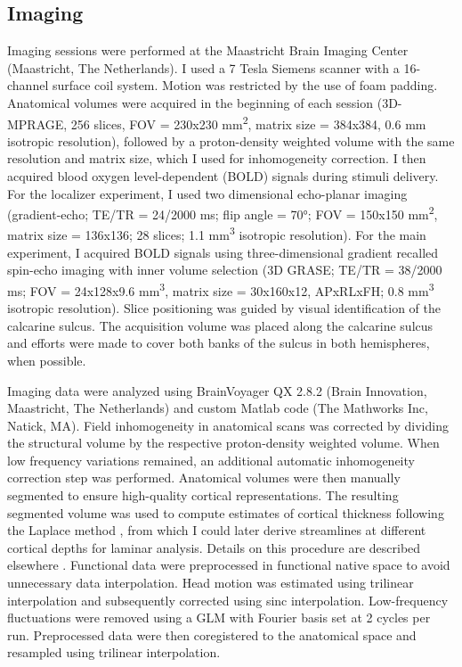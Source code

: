 \subsection{Imaging}
Imaging sessions were performed at the Maastricht Brain Imaging Center (Maastricht, The Netherlands). I used a 7 Tesla Siemens scanner with a 16-channel surface coil system. Motion was restricted by the use of foam padding. Anatomical volumes were acquired in the beginning of each session (3D-MPRAGE, 256 slices, FOV = 230x230 mm\textsuperscript{2}, matrix size = 384x384, 0.6 mm isotropic resolution), followed by a proton-density weighted volume with the same resolution and matrix size, which I used for inhomogeneity correction. I then acquired blood oxygen level-dependent (BOLD) signals during stimuli delivery. For the localizer experiment, I used two dimensional echo-planar imaging (gradient-echo; TE/TR = 24/2000 ms; flip angle = \ang{70}; FOV = 150x150 mm\textsuperscript{2}, matrix size = 136x136; 28 slices; 1.1 mm\textsuperscript{3} isotropic resolution). For the main experiment, I acquired BOLD signals using three-dimensional gradient recalled spin-echo imaging with inner volume selection (3D GRASE; TE/TR = 38/2000 ms; FOV = 24x128x9.6 mm\textsuperscript{3}, matrix size = 30x160x12, APxRLxFH; 0.8 mm\textsuperscript{3} isotropic resolution). Slice positioning was guided by visual identification of the calcarine sulcus. The acquisition volume was placed along the calcarine sulcus and efforts were made to cover both banks of the sulcus in both hemispheres, when possible.

Imaging data were analyzed using BrainVoyager QX 2.8.2 (Brain Innovation, Maastricht, The Netherlands) and custom Matlab code (The Mathworks Inc, Natick, MA). Field inhomogeneity in anatomical scans was corrected by dividing the structural volume by the respective proton-density weighted volume. When low frequency variations remained, an additional automatic inhomogeneity correction step was performed. Anatomical volumes were then manually segmented to ensure high-quality cortical representations. The resulting segmented volume was used to compute estimates of cortical thickness following the Laplace method \cite{Jones:2000cr}, from which I could later derive streamlines at different cortical depths for laminar analysis. Details on this procedure are described elsewhere \cite{Zimmermann:2011kl}. Functional data were preprocessed in functional native space to avoid unnecessary data interpolation. Head motion was estimated using trilinear interpolation and subsequently corrected using sinc interpolation. Low-frequency fluctuations were removed using a GLM with Fourier basis set at 2 cycles per run. Preprocessed data were then coregistered to the anatomical space and resampled using trilinear interpolation.


